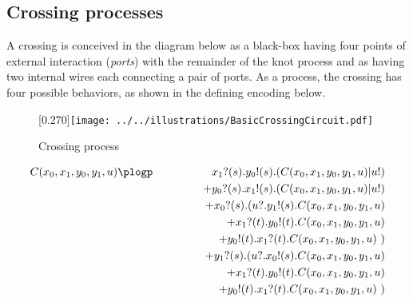 \subsection{Crossing processes}\label{sub:crossing_processes} %
A crossing is conceived in the diagram below as a black-box having
four points of external interaction (\emph{ports}) with the remainder
of the knot process and as having two internal wires each connecting a
pair of ports. As a process, the crossing has four possible behaviors,
as shown in the defining encoding below.
\begin{figure}[hbp]
    \centering
    \scalebox{0.27}[0.270]{\texttt{[image: ../../illustrations/BasicCrossingCircuit.pdf]}}
    \caption{ Crossing process }
\end{figure}

\begin{eqnarray*}
   C(x_0,x_1,y_0,y_1,u) & \plogp   & \quad x_1?(s).y_0!(s).(C(x_0,x_1,y_0,y_1,u)|u!) \nonumber \\
  & & + y_0?(s).x_1!(s).(C(x_0,x_1,y_0,y_1,u)|u!) \nonumber \\
  & & + x_0?(s).(u?.y_1!(s).C(x_0,x_1,y_0,y_1,u) \nonumber \\
  & & \hspace{49pt} + x_1?(t).y_0!(t).C(x_0,x_1,y_0,y_1,u) \nonumber \\
  & & \hspace{49pt} + y_0!(t).x_1?(t).C(x_0,x_1,y_0,y_1,u)\ ) \nonumber \\
  & & + y_1?(s).(u?.x_0!(s).C(x_0,x_1,y_0,y_1,u) \nonumber \\
  & & \hspace{49pt} + x_1?(t).y_0!(t).C(x_0,x_1,y_0,y_1,u) \nonumber \\
  & & \hspace{49pt} + y_0!(t).x_1?(t).C(x_0,x_1,y_0,y_1,u)\ ) \nonumber 
\end{eqnarray*}

